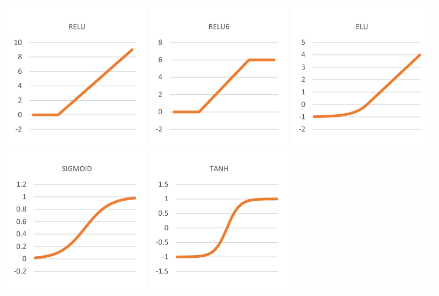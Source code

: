 \begin{figure}[H]
\centering
{}
{\includegraphics[width=0.325\textwidth]{images/activation_relu}}
{\includegraphics[width=0.325\textwidth]{images/activation_relu6}}
{\includegraphics[width=0.325\textwidth]{images/activation_elu}}
{\includegraphics[width=0.325\textwidth]{images/activation_sigmoid}}
{\includegraphics[width=0.325\textwidth]{images/activation_tanh}}

\end{figure}
